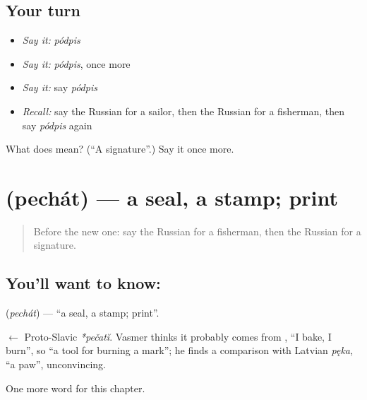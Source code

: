 \subsection*{Your turn}
\begin{itemize}
\raggedright
  \item \emph{Say it:} \emph{pódpis}
  \item \emph{Say it:} \emph{pódpis}, once more
  \item \emph{Say it:} say \emph{pódpis}
  \item \emph{Recall:} say the Russian for a sailor, then the Russian for a fisherman, then say \emph{pódpis} again
\end{itemize}

\begin{tcolorbox}[breakable,colback=teal!4,colframe=teal!35!black,title={Before you move on}]
What does  mean? (\textquotedblleft{}A signature\textquotedblright{}.) Say it once more.
\end{tcolorbox}
\section[\texorpdfstring{\ru{печать} (pechát)}{печать (pechát)}]{ (pechát) — a seal, a stamp; print}

\label{lesson:RU-C203-pechat}



\begin{quote}
Before the new one: say the Russian for a fisherman, then the Russian for a signature.
\end{quote}

\subsection*{You'll want to know: }
\textbf{} (\emph{pechát}) — \textquotedblleft{}a seal, a stamp; print\textquotedblright{}.

\begin{cousinweb}
\textbf{} $\leftarrow$ Proto-Slavic \emph{*pečatĭ}. Vasmer thinks it probably comes from \emph{}, \textquotedblleft{}I bake, I burn\textquotedblright{}, so \textquotedblleft{}a tool for burning a mark\textquotedblright{}; he finds a comparison with Latvian \emph{pęka}, \textquotedblleft{}a paw\textquotedblright{}, unconvincing.
\end{cousinweb}

\begin{grammarlens}[title={What you've built}]
One more word for this chapter.
\end{grammarlens}

